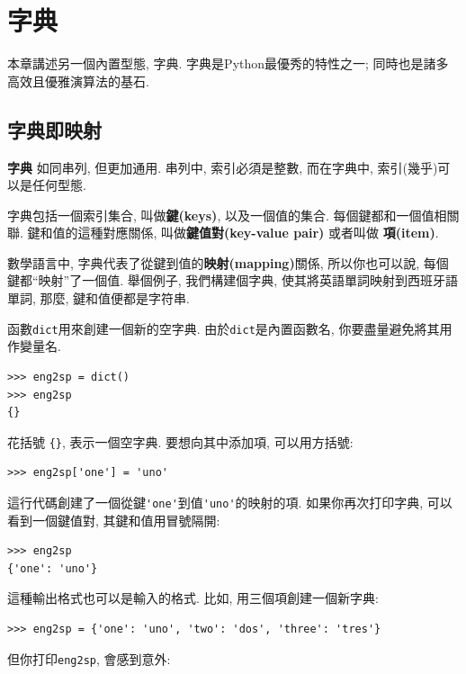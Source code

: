 \documentclass[10pt]{book}
\begin{document}
\chapter{字典}

本章講述另一個內置型態, 字典. 
字典是Python最優秀的特性之一; 同時也是諸多高效且優雅演算法的基石. 


\section{字典即映射}


 {\bf 字典} 如同串列, 但更加通用. 串列中, 索引必須是整數, 
而在字典中, 索引(幾乎)可以是任何型態. 

字典包括一個索引集合, 叫做{\bf 鍵(keys)}, 以及一個值的集合. 
每個鍵都和一個值相關聯. 鍵和值的這種對應關係, 叫做{\bf 鍵值對(key-value pair)}
或者叫做 {\bf 項(item)}.  

數學語言中, 字典代表了從鍵到值的{\bf 映射(mapping)}關係, 
所以你也可以說, 每個鍵都``映射''了一個值. 
舉個例子, 我們構建個字典, 使其將英語單詞映射到西班牙語單詞, 
那麼, 鍵和值便都是字符串. 

函數{\tt dict}用來創建一個新的空字典. 
由於{\tt dict}是內置函數名, 你要盡量避免將其用作變量名. 

\begin{verbatim}
>>> eng2sp = dict()
>>> eng2sp
{}
\end{verbatim}

花括號 \verb"{}", 表示一個空字典. 
要想向其中添加項, 可以用方括號:

\begin{verbatim}
>>> eng2sp['one'] = 'uno'
\end{verbatim}
%
這行代碼創建了一個從鍵\verb"'one'"到值\verb"'uno'"的映射的項. 
如果你再次打印字典, 可以看到一個鍵值對, 其鍵和值用冒號隔開:

\begin{verbatim}
>>> eng2sp
{'one': 'uno'}
\end{verbatim}
%

這種輸出格式也可以是輸入的格式. 比如, 用三個項創建一個新字典:

\begin{verbatim}
>>> eng2sp = {'one': 'uno', 'two': 'dos', 'three': 'tres'}
\end{verbatim}
%
但你打印{\tt eng2sp}, 會感到意外:
\end{document}
